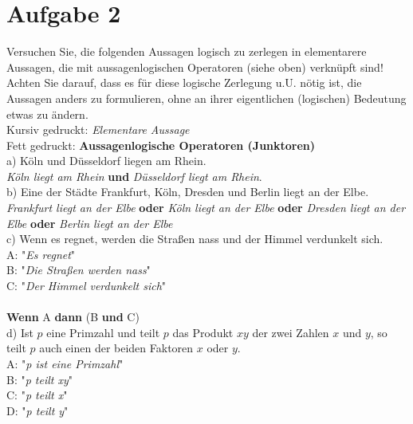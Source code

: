 \section*{Aufgabe 2}

Versuchen Sie, die folgenden Aussagen logisch zu zerlegen in elementarere Aussagen, die mit aussagenlogischen Operatoren (siehe oben) verknüpft sind!\\

Achten Sie darauf, dass es für diese logische Zerlegung u.U. nötig ist, die Aussagen anders zu formulieren, ohne an ihrer eigentlichen (logischen) Bedeutung etwas zu ändern.\\

Kursiv gedruckt: \textit{Elementare Aussage}\\
Fett gedruckt: \textbf{Aussagenlogische Operatoren (Junktoren)}\\

a) Köln und Düsseldorf liegen am Rhein.\\

\textit{Köln liegt am Rhein} \textbf{und} \textit{Düsseldorf liegt am Rhein}.\\

b) Eine der Städte Frankfurt, Köln, Dresden und Berlin liegt an der Elbe.\\

\textit{Frankfurt liegt an der Elbe} \textbf{oder} \textit{Köln liegt an der Elbe} \textbf{oder} \textit{Dresden liegt an der Elbe} \textbf{oder} \textit{Berlin liegt an der Elbe}\\

c) Wenn es regnet, werden die Straßen nass und der Himmel verdunkelt sich.\\

A: "\textit{Es regnet}"\\
B: "\textit{Die Straßen werden nass}"\\
C: "\textit{Der Himmel verdunkelt sich}"\\~\\

\textbf{Wenn} A \textbf{dann} (B \textbf{und} C)\\

d) Ist $p$ eine Primzahl und teilt $p$ das Produkt $xy$ der zwei Zahlen $x$ und $y$, so teilt $p$ auch einen der beiden Faktoren $x$ oder $y$.\\

A: "\textit{p ist eine Primzahl}"\\
B: "\textit{p teilt xy}"\\
C: "\textit{p teilt x}"\\
D: "\textit{p teilt y}"\\


